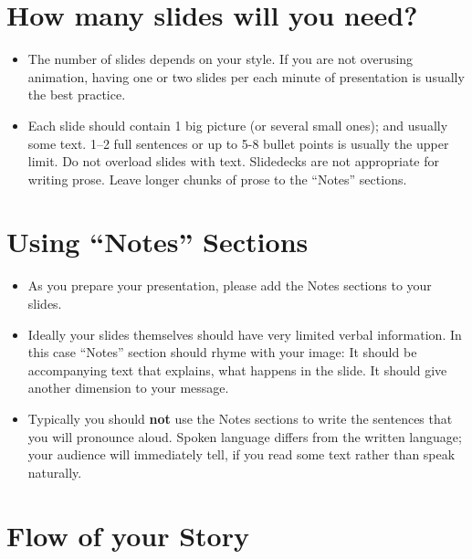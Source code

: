 \documentclass[jou]{apa6}
\begin{document}
\section{How many slides will you need?}

\begin{itemize}
\item The number of slides depends on your style. If you are not overusing animation,
having one or two slides per each minute of presentation is usually the best practice. 
\item Each slide should contain 1 big picture (or several small ones); and usually some text. 
1--2 full sentences or up to 5-8 bullet points is usually the upper limit.
Do not overload slides with text. Slidedecks are not appropriate for writing prose.
Leave longer chunks of prose to the ``Notes'' sections.
\end{itemize}



\section{Using ``Notes'' Sections}

\begin{itemize}
\item As you prepare your presentation, please add the Notes sections to your slides. 
\item Ideally your slides themselves should have very limited verbal information. 
In this case ``Notes'' section should rhyme with your image: It should be accompanying 
text that explains, what happens in the slide. It should give another dimension to your message.
\item Typically you should {\bf not} use the Notes sections to write the sentences that you 
will pronounce aloud. Spoken language differs from the written language; your audience
will immediately tell, if you read some text rather than speak naturally.
\end{itemize}


\section{Flow of your Story}
\end{document}
